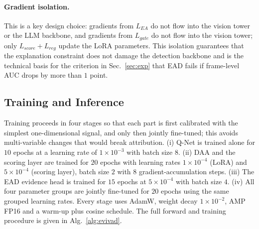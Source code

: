 \paragraph{Gradient isolation.} This is a key design choice: gradients from $L_{EA}$ do not flow into the vision tower or the LLM backbone, and gradients from $L_{gate}$ do not flow into the vision tower; only $L_{score} + L_{reg}$ update the LoRA parameters. This isolation guarantees that the explanation constraint does not damage the detection backbone and is the technical basis for the criterion in Sec.~\ref{sec:exp} that EAD fails if frame-level AUC drops by more than $1$ point.

\subsection{Training and Inference}

Training proceeds in four stages so that each part is first calibrated with the simplest one-dimensional signal, and only then jointly fine-tuned; this avoids multi-variable changes that would break attribution. (i) Q-Net is trained alone for $10$ epochs at a learning rate of $1\times10^{-3}$ with batch size $8$. (ii) DAA and the scoring layer are trained for $20$ epochs with learning rates $1\times10^{-4}$ (LoRA) and $5\times10^{-4}$ (scoring layer), batch size $2$ with $8$ gradient-accumulation steps. (iii) The EAD evidence head is trained for $15$ epochs at $5\times10^{-4}$ with batch size $4$. (iv) All four parameter groups are jointly fine-tuned for $20$ epochs using the same grouped learning rates. Every stage uses AdamW, weight decay $1\times10^{-2}$, AMP FP16 and a warm-up plus cosine schedule. The full forward and training procedure is given in Alg.~\ref{alg:evivad}.


